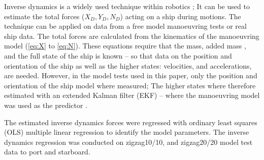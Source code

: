 Inverse dynamics is a widely used technique within robotics \citep{faber_inverse_2018}; It can be used to estimate the total forces ($X_D,Y_D,N_D$) acting on a ship during motions. The technique can be applied on data from a free model manoeuvring tests or real ship data. The total forces are calculated from the kinematics of the manoeuvring model (\autoref{eq:X} to \autoref{eq:N}). These equations require that the mass, added mass , and the full state of the ship is known -- so that data on the position and orientation of the ship as well as the higher states: velocities, and accelerations, are needed.
However, in the model tests used in this paper, only the position and orientation of the ship model where measured;
The higher states where therefore estimated with an extended Kalman filter (EKF) -- where the manoeuvring model was used as the predictor \citep{alexandersson_wpcc_2022}.

The estimated inverse dynamics forces were regressed with ordinary least squares (OLS) multiple
linear regression to identify the model parameters. The inverse dynamics regression was conducted on zigzag10/10, and zigzag20/20 model test data to port and starboard.  